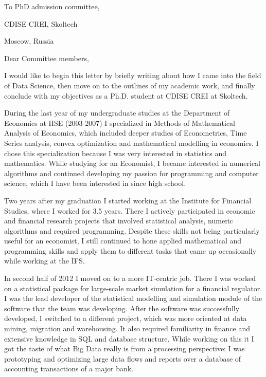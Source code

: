 \documentclass[14pt]{letter}
\begin{document}
\vspace{1.5cm}

\begin{minipage}{0.5\linewidth}
To PhD admission committee, \par
CDISE CREI, Skoltech \par
Moscow, Russia \par
\end{minipage} \par\bigskip

Dear Committee members, \par\bigskip

I would like to begin this letter by briefly writing about how I came into the field of Data Science, then move on to the outlines of my academic work, and finally conclude with my objectives as a Ph.D. student at CDISE CREI at Skoltech. \par\medskip

During the last year of my undergraduate studies at the Department of Economics at HSE (2003-2007) I specialized in Methods of Mathematical Analysis of Economics, which included deeper studies of Econometrics, Time Series analysis, convex optimization and mathematical modelling in economics. I chose this specialization because I was very interested in statistics and mathematics. While studying for an Economist, I became interested in numerical algorithms and continued developing my passion for programming and computer science, which I have been interested in since high school. \par\medskip

Two years after my graduation I started working at the Institute for Financial Studies, where I worked for 3.5 years. There I actively participated in economic and financial research projects that involved statistical analysis, numeric algorithms and required programming. Despite these skills not being particularly useful for an economist, I still continued to hone applied mathematical and programming skills and apply them to different tasks that came up occasionally while working at the IFS. \par\medskip

In second half of 2012 I moved on to a more IT-centric job. There I was worked on a statistical package for large-scale market simulation for a financial regulator. I was the lead developer of the statistical modelling and simulation module of the software that the team was developing. After the software was successfully developed, I switched to a different project, which was more oriented at data mining, migration and warehousing. It also required familiarity in finance and extensive knowledge in SQL and database structure. While working on this it I got the taste of what Big Data really is from a processing perspective: I was prototyping and optimizing large data flows and reports over a database of accounting transactions of a major bank. \par\medskip
\end{document}
